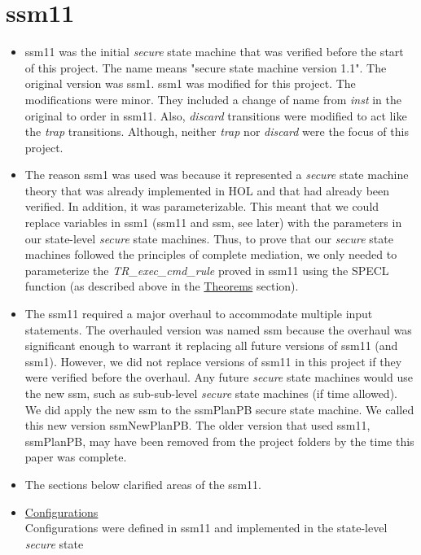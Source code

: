 \section{ssm11}
\label{sec:ssm11}

\begin{itemize}
\item ssm11 was the initial \textit{secure} state machine that was verified before the
  start of this project.  The name means "secure state machine version 1.1".  The original
  version was ssm1.  ssm1 was modified for this project.  The modifications were minor.
  They included a change of name from \textit{inst} in the original to order in ssm11.
  Also, \textit{discard} transitions were modified to act like the \textit{trap} transitions.
  Although, neither \textit{trap} nor \textit{discard} were the focus of this project.
\item The reason ssm1 was used was because it represented a \textit{secure} state machine
  theory that was already implemented in HOL and that had already been verified.  In addition,
  it was parameterizable.  This meant that we could replace variables in ssm1 (ssm11 and ssm,
  see later) with the parameters in our state-level \textit{secure} state machines.  Thus, to
  prove that our \textit{secure} state machines followed the principles of complete mediation,
  we only needed to parameterize the \textit{TR_exec_cmd_rule} proved in ssm11 using the SPECL
  function (as described above in the \underline{Theorems} section).
\item The ssm11 required a major overhaul to accommodate multiple input statements.  The
  overhauled version was named ssm because the overhaul was significant enough to warrant it
  replacing all future versions of ssm11 (and ssm1).  However, we did not replace versions of
  ssm11 in this project if they were verified before the overhaul.  Any future \textit{secure}
  state machines would use the new ssm, such as sub-sub-level \textit{secure} state machines
  (if time allowed).  We did apply the new ssm to the ssmPlanPB secure state machine.  We
  called this new version ssmNewPlanPB.  The older version that used ssm11, ssmPlanPB, may
  have been removed from the project folders by the time this paper was complete.
\item The sections below clarified areas of the ssm11.
\item \underline{Configurations}\\
  Configurations were defined in ssm11 and implemented in the state-level \textit{secure} state

\end{itemize}
